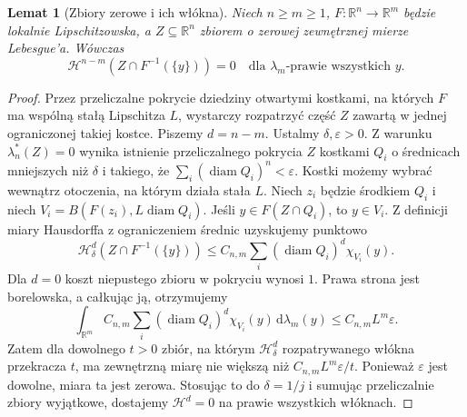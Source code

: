 \documentclass[11pt,a4paper,oneside]{book}
\numberwithin{equation}{chapter}
\theoremstyle{plain}
\newtheorem{lemat}[twierdzenie]{Lemat}
\theoremstyle{definition}
\theoremstyle{remark}
\begin{document}
\begin{lemat}[Zbiory zerowe i ich włókna]
\label{lem:null-fibres-lipschitz-28}
Niech $n\ge m\ge1$, $F:\mathbb R^n\to\mathbb R^m$
będzie lokalnie Lipschitzowska, a
$Z\subseteq\mathbb R^n$ zbiorem o zerowej zewnętrznej
mierze Lebesgue'a. Wówczas
\[
 \mathcal H^{n-m}(Z\cap F^{-1}(\{y\}))=0
 \quad\text{dla }\lambda_m\text{-prawie wszystkich }y.
\]
\end{lemat}
\begin{proof}
Przez przeliczalne pokrycie dziedziny otwartymi
kostkami, na których $F$ ma wspólną stałą
Lipschitza $L$, wystarczy rozpatrzyć część $Z$
zawartą w jednej ograniczonej takiej kostce.
Piszemy $d=n-m$. Ustalmy $\delta,\varepsilon>0$.
Z warunku $\lambda_n^*(Z)=0$ wynika istnienie
przeliczalnego pokrycia $Z$ kostkami $Q_i$
o średnicach mniejszych niż $\delta$ i takiego, że
$\sum_i(\operatorname{diam}Q_i)^n<\varepsilon$.
Kostki możemy wybrać wewnątrz otoczenia,
na którym działa stała $L$.
Niech $z_i$ będzie środkiem $Q_i$ i niech
$V_i=B(F(z_i),L\operatorname{diam}Q_i)$.
Jeśli $y\in F(Z\cap Q_i)$, to $y\in V_i$.
Z definicji miary Hausdorffa z ograniczeniem
średnic uzyskujemy punktowo
\[
 \mathcal H^d_\delta(Z\cap F^{-1}(\{y\}))
 \le C_{n,m}\sum_i(\operatorname{diam}Q_i)^d\chi_{V_i}(y).
\]
Dla $d=0$ koszt niepustego zbioru w pokryciu
wynosi $1$. Prawa strona jest borelowska,
a całkując ją, otrzymujemy
\[
 \int_{\mathbb R^m}C_{n,m}\sum_i
 (\operatorname{diam}Q_i)^d\chi_{V_i}(y)
 \,\mathrm d\lambda_m(y)
 \le C_{n,m}L^m\varepsilon.
\]
Zatem dla dowolnego $t>0$ zbiór, na którym
$\mathcal H^d_\delta$ rozpatrywanego włókna
przekracza $t$, ma zewnętrzną miarę nie większą
niż $C_{n,m}L^m\varepsilon/t$. Ponieważ
$\varepsilon$ jest dowolne, miara ta jest zerowa.
Stosując to do $\delta=1/j$ i sumując
przeliczalnie zbiory wyjątkowe, dostajemy
$\mathcal H^d=0$ na prawie wszystkich włóknach.
\end{proof}
\end{document}
